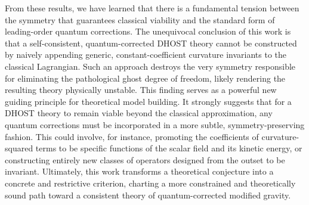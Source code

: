\documentclass[twocolumn]{aastex631}
\begin{document}
From these results, we have learned that there is a fundamental tension between the symmetry that guarantees classical viability and the standard form of leading-order quantum corrections. The unequivocal conclusion of this work is that a self-consistent, quantum-corrected DHOST theory cannot be constructed by naively appending generic, constant-coefficient curvature invariants to the classical Lagrangian. Such an approach destroys the very symmetry responsible for eliminating the pathological ghost degree of freedom, likely rendering the resulting theory physically unstable. This finding serves as a powerful new guiding principle for theoretical model building. It strongly suggests that for a DHOST theory to remain viable beyond the classical approximation, any quantum corrections must be incorporated in a more subtle, symmetry-preserving fashion. This could involve, for instance, promoting the coefficients of curvature-squared terms to be specific functions of the scalar field and its kinetic energy, or constructing entirely new classes of operators designed from the outset to be invariant. Ultimately, this work transforms a theoretical conjecture into a concrete and restrictive criterion, charting a more constrained and theoretically sound path toward a consistent theory of quantum-corrected modified gravity.

{}

\end{document}
